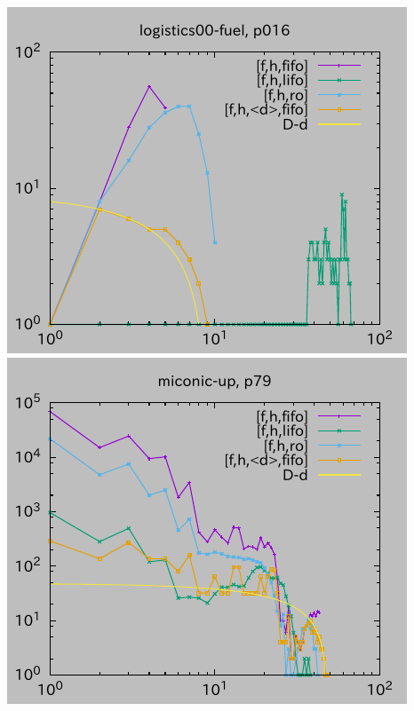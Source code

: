 \includegraphics{img/depth/logistics00-fuel/p016.pdf}
\includegraphics{img/depth/miconic-up/p79.pdf}
